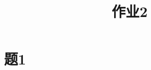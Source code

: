 \documentclass[cn]{homework}
\title{作业2}
\begin{document}
    \maketitle    

    \section{题1}
\end{document}
